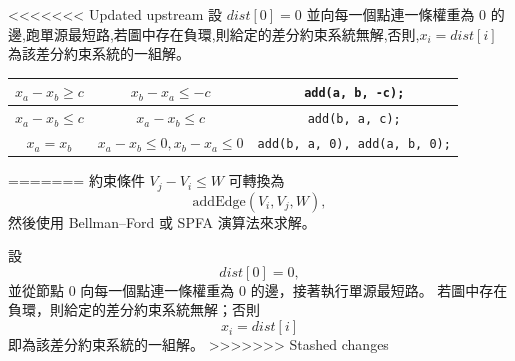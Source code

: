 <<<<<<< Updated upstream
設 $dist[0] = 0$ 並向每一個點連一條權重為 $0$ 的邊,跑單源最短路,若圖中存在負環,則給定的差分約束系統無解,否則,$x_i = dist[i]$ 為該差分約束系統的一組解。
\begin{tabular}{|c|c|c|}
\hline
$x_a - x_b \geq c$ & $x_b - x_a \leq -c$ & \texttt{add(a, b, -c);} \\
\hline
$x_a - x_b \leq c$ & $x_a - x_b \leq c$ & \texttt{add(b, a, c);} \\
\hline
$x_a = x_b$ & $x_a - x_b \leq 0, x_b - x_a \leq 0$ & \texttt{add(b, a, 0), add(a, b, 0);} \\
\hline
\end{tabular}
=======
約束條件 $V_j - V_i \leq W$ 可轉換為 
\[
\text{addEdge}(V_i, V_j, W),
\]
然後使用 Bellman--Ford 或 SPFA 演算法來求解。  

設
\[
dist[0] = 0,
\]
並從節點 $0$ 向每一個點連一條權重為 $0$ 的邊，接著執行單源最短路。  
若圖中存在負環，則給定的差分約束系統無解；否則
\[
x_i = dist[i]
\]
即為該差分約束系統的一組解。
>>>>>>> Stashed changes
